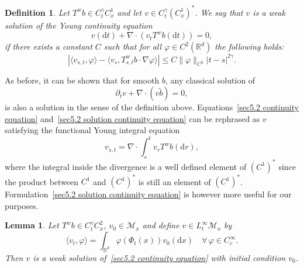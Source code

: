 \documentclass[10pt]{article}
\newcommand{\mathd}{\mathrm{d}}
\newtheorem{definition}{Definition}
\newtheorem{lemma}{Lemma}
\begin{document}
\begin{definition}
  \label{sec5.2 defn weak continuity eq}Let $T^w b \in C^{\gamma}_t C_x^1$ and
  let $v \in C^{\gamma}_t (C^1_x)^{\ast}$. We say that $v$ is a weak solution
  of the Young continuity equation
  \begin{equation}
    v (\mathd t) + \nabla \cdot (v_t T^w b (\mathd t)) = 0, \label{sec5.2
    continuity equation}
  \end{equation}
  if there exists a constant $C$ such that for all $\varphi \in C^2
  (\mathbb{R}^d)$ the following holds:
  \begin{equation}
    | \langle v_{s, t}, \varphi \rangle - \langle v_s, T^w_{s, t} b \cdot
    \nabla \varphi \rangle | \leqslant C \| \varphi \|_{C^2} | t - s |^{2
    \gamma} . \label{sec5.2 solution continuity equation}
  \end{equation}
\end{definition}

\begin{remark}
  As before, it can be shown that for smooth $b$, any classical solution of
  \[ \partial_t v + \nabla \cdot (v \tilde{b}) = 0, \]
  is also a solution in the sense of the definition above.
  Equations~{\eqref{sec5.2 continuity equation}} and~{\eqref{sec5.2 solution
  continuity equation}} can be rephrased as $v$ satisfying the functional
  Young integral equation
  \[ v_{s, t} = \nabla \cdot \int_s^t v_r T^w b (\mathd r), \]
  where the integral inside the divergence is a well defined element of
  $(C^1)^{\ast}$ since the product between $C^1$ and $(C^1)^{\ast}$ is still
  an element of $(C^1)^{\ast}$. Formulation~{\eqref{sec5.2 solution continuity
  equation}} is however more useful for our purposes.
\end{remark}

\begin{lemma}
  \label{sec5.2 lemma existence continuity}Let $T^w b \in C^{\gamma}_t C^2_x$,
  $v_0 \in \mathcal{M}_x$ and define $v \in L^{\infty}_t \mathcal{M}_x$ by
  \[ \langle v_t, \varphi \rangle = \int_{\mathbb{R}^d} \varphi (\Phi_t (x))
     v_0 (\mathd x) \quad \forall \, \varphi \in C^{\infty}_c . \]
  Then $v$ is a weak solution of~{\eqref{sec5.2 continuity equation}} with
  initial condition $v_0$.
\end{lemma}
\end{document}
